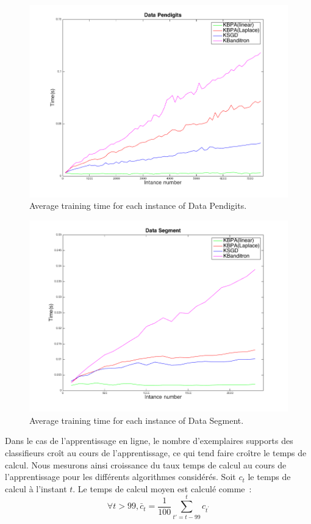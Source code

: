 \documentclass[preprint,12pt,authoryear]{elsarticle}
\begin{document}
\begin{figure}[t!]
	\includegraphics[width=\linewidth]{figs/Pendigits_kernel_T.png}
	\caption{Average training time for each instance of Data Pendigits.}
	\label{pic:PKT}
\end{figure}

\begin{figure}[t!]
	\centerline{
		\includegraphics[width=\linewidth]{figs/Segment_kernel_T.png}}
	\caption{Average training time for each instance of Data Segment.}
	\label{pic:SKT}
\end{figure}

Dans le cas de l'apprentissage en ligne, le nombre d'exemplaires supports des classifieurs croît au cours de l'apprentissage, ce qui tend faire croître le temps de calcul. Nous mesurons ainsi croissance du taux temps de calcul au cours de l'apprentissage pour les différents algorithmes considérés. Soit $c_t$ le temps de calcul à l'instant $t$.  Le temps de calcul moyen est calculé comme~: 
$$\forall t>99, \bar{c}_t = \frac{1}{100} \sum_{t'=t - 99}^t c_{t^\prime}$$
\end{document}
